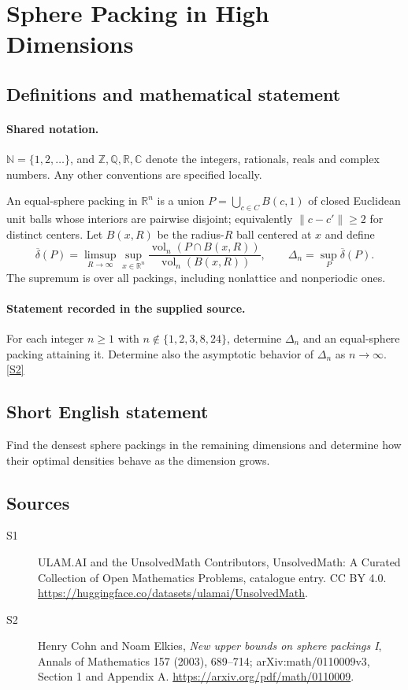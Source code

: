 \documentclass[11pt]{article}
\newcommand{\sref}[2]{\hyperlink{source:#1:#2}{[S#2]}}
\begin{document}
\section{Sphere Packing in High Dimensions}\label{statement}

\subsection{Definitions and mathematical statement}

\paragraph{Shared notation.}$\mathbb N=\{1,2,\ldots\}$, and $\mathbb Z,\mathbb Q,\mathbb R,\mathbb C$ denote the integers, rationals, reals and complex numbers. Any other conventions are specified locally.


An equal-sphere packing in $\mathbb R^n$ is a union $P=\bigcup_{c\in C}B(c,1)$ of closed Euclidean unit balls whose interiors are pairwise disjoint; equivalently $\lVert c-c'\rVert\geq2$ for distinct centers. Let $B(x,R)$ be the radius-$R$ ball centered at $x$ and define
\[
\overline\delta(P)=\limsup_{R\to\infty}\sup_{x\in\mathbb R^n}
\frac{\operatorname{vol}_n(P\cap B(x,R))}{\operatorname{vol}_n(B(x,R))},\qquad
\Delta_n=\sup_{P}\overline\delta(P).
\]
The supremum is over all packings, including nonlattice and nonperiodic ones.
\paragraph{Statement recorded in the supplied source.}
For each integer $n\geq1$ with $n\notin\{1,2,3,8,24\}$, determine $\Delta_n$ and an equal-sphere packing attaining it. Determine also the asymptotic behavior of $\Delta_n$ as $n\to\infty$. \sref{statement}{2}

\subsection{Short English statement}
Find the densest sphere packings in the remaining dimensions and determine how their optimal densities behave as the dimension grows.
\subsection{Sources}
\begin{description}
\item[\hypertarget{source:statement:1}{S1}] ULAM.AI and the UnsolvedMath Contributors, UnsolvedMath: A Curated Collection of Open Mathematics Problems, catalogue entry. CC BY 4.0. \url{https://huggingface.co/datasets/ulamai/UnsolvedMath}.
\item[\hypertarget{source:statement:2}{S2}] Henry Cohn and Noam Elkies, \emph{New upper bounds on sphere packings I}, Annals of Mathematics 157 (2003), 689--714; arXiv:math/0110009v3, Section 1 and Appendix A. \url{https://arxiv.org/pdf/math/0110009}.
\end{description}
\label{end:statement}
\end{document}
